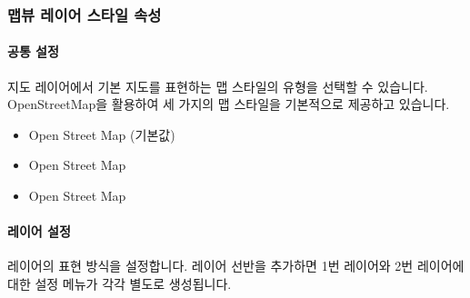 \documentclass[letterpaper,10pt,english]{sphinxmanual}
\begin{document}
\subsubsection{맵뷰 레이어 스타일 속성}
\label{\detokenize{discovery/part04/map_chart:id5}}

\paragraph{공통 설정}
\label{\detokenize{discovery/part04/map_chart:id6}}
지도 레이어에서 기본 지도를 표현하는 맵 스타일의 유형을 선택할 수 있습니다. OpenStreetMap을 활용하여 세 가지의 맵 스타일을 기본적으로 제공하고 있습니다.
\begin{quote}

\begin{figure}[H]
\centering

\noindent{}
\end{figure}
\end{quote}
\begin{itemize}
\item {} 
Open Street Map  (기본값)

\item {} 
Open Street Map 

\item {} 
Open Street Map 

\end{itemize}


\paragraph{레이어 설정}
\label{\detokenize{discovery/part04/map_chart:id7}}
레이어의 표현 방식을 설정합니다. 레이어 선반을 추가하면 1번 레이어와 2번 레이어에 대한 설정 메뉴가 각각 별도로 생성됩니다.
\end{document}
